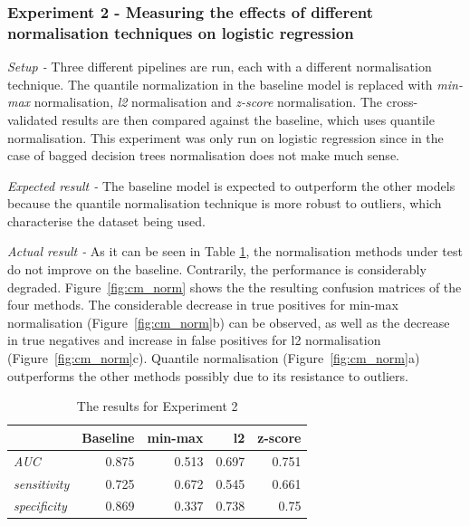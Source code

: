 \documentclass{article}[paper=a4,pagesize=auto,10pt]
\begin{document}
\subsubsection{Experiment 2 - Measuring the effects of different normalisation techniques on logistic regression}

\textit{Setup -} Three different pipelines are run, each with a different normalisation technique. The quantile normalization in the baseline model is replaced with \textit{min-max} normalisation, \textit{l2} normalisation and \textit{z-score} normalisation.  The cross-validated results are then compared against the baseline, which uses quantile normalisation. This experiment was only run on logistic regression since in the case of bagged decision trees normalisation does not make much sense.
\smallskip

\textit{Expected result -} The baseline model is expected to outperform the other models because the quantile normalisation technique is more robust to outliers, which characterise the dataset being used.
\smallskip

\textit{Actual result -} As it can be seen in Table \ref{tab:lr2}, the normalisation methods under test do not improve on the baseline. Contrarily, the performance is considerably degraded. Figure~\ref{fig:cm_norm} shows the the resulting confusion matrices of the four methods. The considerable decrease in true positives for min-max normalisation (Figure~\ref{fig:cm_norm}b) can be observed, as well as the decrease in true negatives and increase in false positives for l2 normalisation (Figure~\ref{fig:cm_norm}c). Quantile normalisation (Figure~\ref{fig:cm_norm}a) outperforms the other methods possibly due to its resistance to outliers.

\begin{table}[ht!]
\centering
\begin{tabular}{lrrrr}
\toprule
{} & \textbf{Baseline} & \textbf{min-max} & \textbf{l2} & \textbf{z-score} \\
\midrule
\textit{AUC} & 0.875 & 0.513 & 0.697 & 0.751\\
\textit{sensitivity} & 0.725 & 0.672 & 0.545 & 0.661\\
\textit{specificity} & 0.869 & 0.337 & 0.738 & 0.75\\
\bottomrule
\end{tabular}
\caption{The results for Experiment 2}
\label{tab:lr2}
\end{table}
\end{document}
